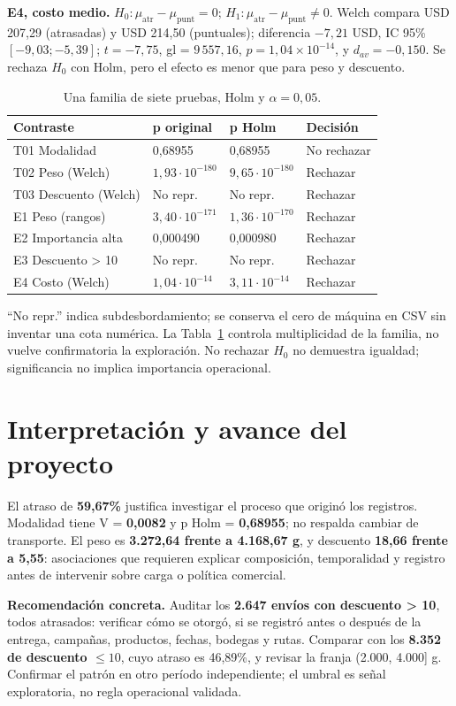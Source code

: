\documentclass[10pt,a4paper]{article}
\begin{document}
\textbf{E4, costo medio.} $H_0:\mu_{\mathrm{atr}}-\mu_{\mathrm{punt}}=0$; $H_1:\mu_{\mathrm{atr}}-\mu_{\mathrm{punt}}\ne0$. Welch compara USD 207,29 (atrasadas) y USD 214,50 (puntuales); diferencia $-7{,}21$ USD, IC 95\% $[-9{,}03;-5{,}39]$; $t=-7{,}75$, gl = $9\,557{,}16$, $p=1{,}04\times10^{-14}$, y $d_{av}=-0{,}150$. Se rechaza $H_0$ con Holm, pero el efecto es menor que para peso y descuento.
\begin{table}[H]\centering\small\caption{Una familia de siete pruebas, Holm y $\alpha=0{,}05$.}\label{tab:holm}
\begin{tabularx}{\linewidth}{@{}Xlll@{}}\toprule Contraste & p original & p Holm & Decisión\\\midrule
T01 Modalidad & 0,68955 & 0,68955 & No rechazar\\
T02 Peso (Welch) & $1{,}93\cdot10^{-180}$ & $9{,}65\cdot10^{-180}$ & Rechazar\\
T03 Descuento (Welch) & No repr. & No repr. & Rechazar\\
E1 Peso (rangos) & $3{,}40\cdot10^{-171}$ & $1{,}36\cdot10^{-170}$ & Rechazar\\
E2 Importancia alta & 0,000490 & 0,000980 & Rechazar\\
E3 Descuento > 10 & No repr. & No repr. & Rechazar\\
E4 Costo (Welch) & $1{,}04\cdot10^{-14}$ & $3{,}11\cdot10^{-14}$ & Rechazar\\\bottomrule\end{tabularx}\end{table}
``No repr.'' indica subdesbordamiento; se conserva el cero de máquina en CSV sin inventar una cota numérica. La Tabla~\ref{tab:holm} controla multiplicidad de la familia, no vuelve confirmatoria la exploración. No rechazar $H_0$ no demuestra igualdad; significancia no implica importancia operacional.


\section{Interpretación y avance del proyecto}
El atraso de \textbf{59,67\%} justifica investigar el proceso que originó los registros. Modalidad tiene V = \textbf{0,0082} y p Holm = \textbf{0,68955}; no respalda cambiar de transporte. El peso es \textbf{3.272,64 frente a 4.168,67 g}, y descuento \textbf{18,66 frente a 5,55}: asociaciones que requieren explicar composición, temporalidad y registro antes de intervenir sobre carga o política comercial.

\textbf{Recomendación concreta.} Auditar los \textbf{2.647 envíos con descuento > 10}, todos atrasados: verificar cómo se otorgó, si se registró antes o después de la entrega, campañas, productos, fechas, bodegas y rutas. Comparar con los \textbf{8.352 de descuento $\le10$}, cuyo atraso es 46,89\%, y revisar la franja (2.000, 4.000] g. Confirmar el patrón en otro período independiente; el umbral es señal exploratoria, no regla operacional validada.
\end{document}
